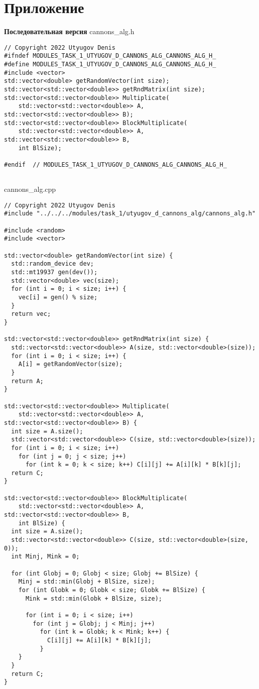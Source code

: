 \documentclass{report}
\begin{document}
\section*{Приложение}
\textbf{Последовательная версия}
\newline
\newline cannons\_alg.h
\begin{lstlisting}
// Copyright 2022 Utyugov Denis
#ifndef MODULES_TASK_1_UTYUGOV_D_CANNONS_ALG_CANNONS_ALG_H_
#define MODULES_TASK_1_UTYUGOV_D_CANNONS_ALG_CANNONS_ALG_H_
#include <vector>
std::vector<double> getRandomVector(int size);
std::vector<std::vector<double>> getRndMatrix(int size);
std::vector<std::vector<double>> Multiplicate(
    std::vector<std::vector<double>> A, std::vector<std::vector<double>> B);
std::vector<std::vector<double>> BlockMultiplicate(
    std::vector<std::vector<double>> A, std::vector<std::vector<double>> B,
    int BlSize);

#endif  // MODULES_TASK_1_UTYUGOV_D_CANNONS_ALG_CANNONS_ALG_H_


\end{lstlisting}
cannons\_alg.cpp
\begin{lstlisting}
// Copyright 2022 Utyugov Denis
#include "../../../modules/task_1/utyugov_d_cannons_alg/cannons_alg.h"

#include <random>
#include <vector>

std::vector<double> getRandomVector(int size) {
  std::random_device dev;
  std::mt19937 gen(dev());
  std::vector<double> vec(size);
  for (int i = 0; i < size; i++) {
    vec[i] = gen() % size;
  }
  return vec;
}

std::vector<std::vector<double>> getRndMatrix(int size) {
  std::vector<std::vector<double>> A(size, std::vector<double>(size));
  for (int i = 0; i < size; i++) {
    A[i] = getRandomVector(size);
  }
  return A;
}

std::vector<std::vector<double>> Multiplicate(
    std::vector<std::vector<double>> A, std::vector<std::vector<double>> B) {
  int size = A.size();
  std::vector<std::vector<double>> C(size, std::vector<double>(size));
  for (int i = 0; i < size; i++)
    for (int j = 0; j < size; j++)
      for (int k = 0; k < size; k++) C[i][j] += A[i][k] * B[k][j];
  return C;
}

std::vector<std::vector<double>> BlockMultiplicate(
    std::vector<std::vector<double>> A, std::vector<std::vector<double>> B,
    int BlSize) {
  int size = A.size();
  std::vector<std::vector<double>> C(size, std::vector<double>(size, 0));
  int Minj, Mink = 0;

  for (int Globj = 0; Globj < size; Globj += BlSize) {
    Minj = std::min(Globj + BlSize, size);
    for (int Globk = 0; Globk < size; Globk += BlSize) {
      Mink = std::min(Globk + BlSize, size);

      for (int i = 0; i < size; i++)
        for (int j = Globj; j < Minj; j++)
          for (int k = Globk; k < Mink; k++) {
            C[i][j] += A[i][k] * B[k][j];
          }
    }
  }
  return C;
}

\end{lstlisting}
\end{document}
